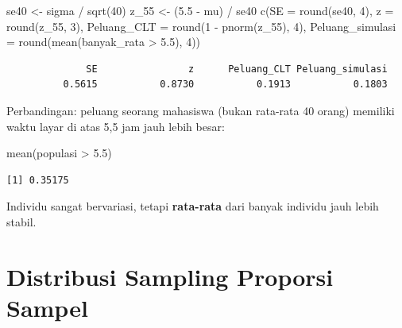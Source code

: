 \documentclass[
  indonesian,
  letterpaper,
]{book}
\newenvironment{Shaded}{\begin{snugshade}}{\end{snugshade}}
\newcommand{\AttributeTok}[1]{\textcolor[rgb]{0.40,0.45,0.13}{#1}}
\newcommand{\DecValTok}[1]{\textcolor[rgb]{0.68,0.00,0.00}{#1}}
\newcommand{\FloatTok}[1]{\textcolor[rgb]{0.68,0.00,0.00}{#1}}
\newcommand{\FunctionTok}[1]{\textcolor[rgb]{0.28,0.35,0.67}{#1}}
\newcommand{\NormalTok}[1]{\textcolor[rgb]{0.00,0.23,0.31}{#1}}
\newcommand{\OtherTok}[1]{\textcolor[rgb]{0.00,0.23,0.31}{#1}}
\newcommand{\SpecialCharTok}[1]{\textcolor[rgb]{0.37,0.37,0.37}{#1}}
\begin{document}
\begin{Shaded}
\begin{Highlighting}[]
\NormalTok{se40 }\OtherTok{\textless{}{-}}\NormalTok{ sigma }\SpecialCharTok{/} \FunctionTok{sqrt}\NormalTok{(}\DecValTok{40}\NormalTok{)}
\NormalTok{z\_55 }\OtherTok{\textless{}{-}}\NormalTok{ (}\FloatTok{5.5} \SpecialCharTok{{-}}\NormalTok{ mu) }\SpecialCharTok{/}\NormalTok{ se40}
\FunctionTok{c}\NormalTok{(}\AttributeTok{SE =} \FunctionTok{round}\NormalTok{(se40, }\DecValTok{4}\NormalTok{), }\AttributeTok{z =} \FunctionTok{round}\NormalTok{(z\_55, }\DecValTok{3}\NormalTok{),}
\AttributeTok{Peluang\_CLT =} \FunctionTok{round}\NormalTok{(}\DecValTok{1} \SpecialCharTok{{-}} \FunctionTok{pnorm}\NormalTok{(z\_55), }\DecValTok{4}\NormalTok{),}
\AttributeTok{Peluang\_simulasi =} \FunctionTok{round}\NormalTok{(}\FunctionTok{mean}\NormalTok{(banyak\_rata }\SpecialCharTok{\textgreater{}} \FloatTok{5.5}\NormalTok{), }\DecValTok{4}\NormalTok{))}
\end{Highlighting}
\end{Shaded}

\begin{verbatim}
              SE                z      Peluang_CLT Peluang_simulasi 
          0.5615           0.8730           0.1913           0.1803 
\end{verbatim}

Perbandingan: peluang seorang mahasiswa (bukan rata-rata 40 orang)
memiliki waktu layar di atas 5,5 jam jauh lebih besar:

\begin{Shaded}
\begin{Highlighting}[]
\FunctionTok{mean}\NormalTok{(populasi }\SpecialCharTok{\textgreater{}} \FloatTok{5.5}\NormalTok{)}
\end{Highlighting}
\end{Shaded}

\begin{verbatim}
[1] 0.35175
\end{verbatim}

Individu sangat bervariasi, tetapi \textbf{rata-rata} dari banyak
individu jauh lebih stabil.


\chapter{Distribusi Sampling Proporsi
Sampel}\label{distribusi-sampling-proporsi-sampel}
\end{document}
